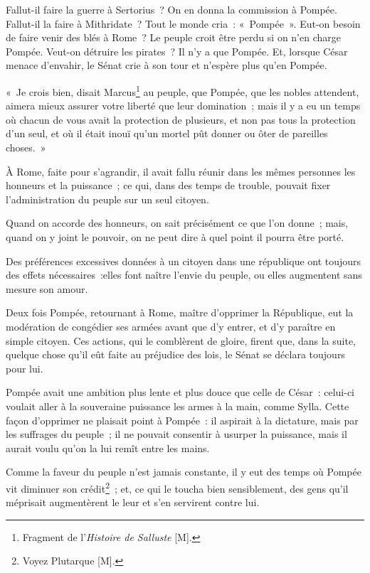 \documentclass[french,twoside]{book} %
\begin{document}
Fallut-il faire la guerre à Sertorius ? On en donna la commission à Pompée. Fallut-il la faire à Mithridate ? Tout le monde cria : « Pompée ». Eut-on besoin de faire venir des blés à Rome ? Le peuple croit être perdu si on n’en charge Pompée. Veut-on détruire les pirates ? Il n’y a que Pompée. Et, lorsque César menace d’envahir, le Sénat crie à son tour et n’espère plus qu’en Pompée.\par
« Je crois bien, disait Marcus\footnote{Fragment de l’{\itshape Histoire de Salluste} [M].} au peuple, que Pompée, que les nobles attendent, aimera mieux assurer votre liberté que leur domination ; mais il y a eu un temps où chacun de vous avait la protection de plusieurs, et non pas tous la protection d’un seul, et où il était inouï qu’un mortel pût donner ou ôter de pareilles choses. »\par
À Rome, faite pour s’agrandir, il avait fallu réunir dans les mêmes personnes les honneurs et la puissance ; ce qui, dans des temps de trouble, pouvait fixer l’administration du peuple sur un seul citoyen.\par
Quand on accorde des honneurs, on sait précisément ce que l’on donne ; mais, quand on y joint le pouvoir, on ne peut dire à quel point il pourra être porté.\par
Des préférences excessives données à un citoyen dans une république ont toujours des effets nécessaires :elles font naître l’envie du peuple, ou elles augmentent sans mesure son amour.\par
Deux fois Pompée, retournant à Rome, maître d’opprimer la République, eut la modération de congédier ses armées avant que d’y entrer, et d’y paraître en simple citoyen. Ces actions, qui le comblèrent de gloire, firent que, dans la suite, quelque chose qu’il eût faite au préjudice des lois, le Sénat se déclara toujours pour lui.\par
Pompée avait une ambition plus lente et plus douce que celle de César : celui-ci voulait aller à la souveraine puissance les armes à la main, comme Sylla. Cette façon d’opprimer ne plaisait point à Pompée : il aspirait à la dictature, mais par les suffrages du peuple ; il ne pouvait consentir à usurper la puissance, mais il aurait voulu qu’on la lui remît entre les mains.\par
Comme la faveur du peuple n’est jamais constante, il y eut des temps où Pompée vit diminuer son crédit\footnote{Voyez Plutarque [M].} ; et, ce qui le toucha bien sensiblement, des gens qu’il méprisait augmentèrent le leur et s’en servirent contre lui.\par
\end{document}
